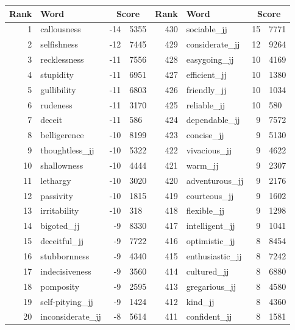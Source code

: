 \begin{table}[tbp]
    \begin{tabular}{| rlr@{.}l | rlr@{.}l |}
    \hline
    \textbf{Rank} & \textbf{Word} & \multicolumn{2}{c|}{\textbf{Score}} & \textbf{Rank} & \textbf{Word} & \multicolumn{2}{c|}{\textbf{Score}} \\
    \hline
    1 & callousness & -14 & 5355    &    430 & sociable\_jj & 15 & 7771 \\
    2 & selfishness & -12 & 7445    &    429 & considerate\_jj & 12 & 9264 \\
    3 & recklessness & -11 & 7556    &    428 & easygoing\_jj & 10 & 4169 \\
    4 & stupidity & -11 & 6951    &    427 & efficient\_jj & 10 & 1380 \\
    5 & gullibility & -11 & 6803    &    426 & friendly\_jj & 10 & 1034 \\
    6 & rudeness & -11 & 3170    &    425 & reliable\_jj & 10 & 580 \\
    7 & deceit & -11 & 586    &    424 & dependable\_jj & 9 & 7572 \\
    8 & belligerence & -10 & 8199    &    423 & concise\_jj & 9 & 5130 \\
    9 & thoughtless\_jj & -10 & 5322    &    422 & vivacious\_jj & 9 & 4622 \\
    10 & shallowness & -10 & 4444    &    421 & warm\_jj & 9 & 2307 \\
    11 & lethargy & -10 & 3020    &    420 & adventurous\_jj & 9 & 2176 \\
    12 & passivity & -10 & 1815    &    419 & courteous\_jj & 9 & 1602 \\
    13 & irritability & -10 & 318    &    418 & flexible\_jj & 9 & 1298 \\
    14 & bigoted\_jj & -9 & 8330    &    417 & intelligent\_jj & 9 & 1041 \\
    15 & deceitful\_jj & -9 & 7722    &    416 & optimistic\_jj & 8 & 8454 \\
    16 & stubbornness & -9 & 4340    &    415 & enthusiastic\_jj & 8 & 7242 \\
    17 & indecisiveness & -9 & 3560    &    414 & cultured\_jj & 8 & 6880 \\
    18 & pomposity & -9 & 2595    &    413 & gregarious\_jj & 8 & 4580 \\
    19 & self-pitying\_jj & -9 & 1424    &    412 & kind\_jj & 8 & 4360 \\
    20 & inconsiderate\_jj & -8 & 5614    &    411 & confident\_jj & 8 & 1581 \\

\end{tabular}
\end{table}
